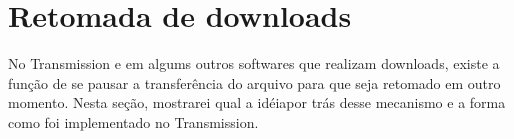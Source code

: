 
\section{Retomada de downloads}

No Transmission e em algums outros softwares que realizam downloads, existe a função de
se pausar a transferência do arquivo para que seja retomado em outro momento. Nesta
seção, mostrarei qual a idéiapor trás desse mecanismo e a forma como foi implementado no
Transmission.